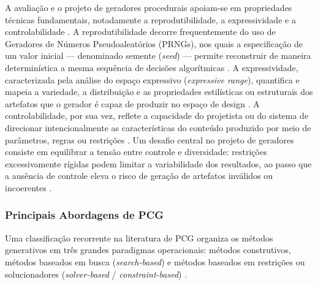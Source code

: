 A avaliação e o projeto de geradores procedurais apoiam-se em propriedades técnicas fundamentais, notadamente a reprodutibilidade, a expressividade e a controlabilidade \cite{tanagra, smith2010analyzing, linden2014dungeons, maleki2024procedural}. A reprodutibilidade decorre frequentemente do uso de Geradores de Números Pseudoaleatórios (PRNGs), nos quais a especificação de um valor inicial --- denominado semente (\textit{seed}) --- permite reconstruir de maneira determinística a mesma sequência de decisões algorítmicas \cite{maleki2024procedural}. A expressividade, caracterizada pela análise do espaço expressivo (\textit{expressive range}), quantifica e mapeia a variedade, a distribuição e as propriedades estilísticas ou estruturais dos artefatos que o gerador é capaz de produzir no espaço de design \cite{smith2010analyzing, linden2013designing}. A controlabilidade, por sua vez, reflete a capacidade do projetista ou do sistema de direcionar intencionalmente as características do conteúdo produzido por meio de parâmetros, regras ou restrições \cite{linden2014dungeons, shaker2016constructive}. Um desafio central no projeto de geradores consiste em equilibrar a tensão entre controle e diversidade: restrições excessivamente rígidas podem limitar a variabilidade dos resultados, ao passo que a ausência de controle eleva o risco de geração de artefatos inválidos ou incoerentes \cite{smith2010analyzing, linden2014dungeons}.

\subsubsection{Principais Abordagens de PCG}
\label{sec:abordagens_pcg}

Uma classificação recorrente na literatura de PCG organiza os métodos generativos em três grandes paradigmas operacionais: métodos construtivos, métodos baseados em busca (\textit{search-based}) e métodos baseados em restrições ou solucionadores (\textit{solver-based} / \textit{constraint-based}) \cite{togelius2011search, pcgbook, summerville2018procedural, maleki2024procedural}.

